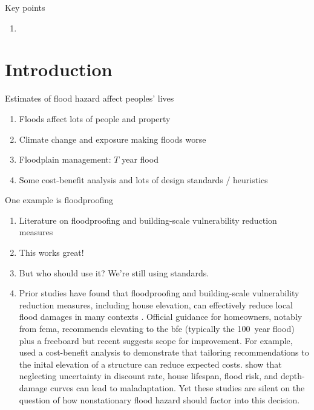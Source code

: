 \documentclass[12pt]{article}
\begin{document}
Key points
\begin{enumerate}
    \item
\end{enumerate}

\clearpage
\section{Introduction}\label{sec:introduction}

Estimates of flood hazard affect peoples' lives
\begin{enumerate}
    \item Floods affect lots of people and property
    \item Climate change and exposure making floods worse
    \item Floodplain management: $T$ year flood
    \item Some cost-benefit analysis and lots of design standards / heuristics
\end{enumerate}
One example is floodproofing
\begin{enumerate}
    \item Literature on floodproofing and building-scale vulnerability reduction measures
    \item This works great!
    \item But who should use it? We're still using standards.
    \item Prior studies have found that floodproofing and building-scale vulnerability reduction measures, including house elevation, can effectively reduce local flood damages in many contexts \citep{demoel_reducing:2014,deruig_building:2020,kreibich_building:2005,slotter_floodproofing:2020,Rozer:2016dn,mobley_mitigation:2020,aerts_cost:2018}.
          Official guidance for homeowners, notably from \gls{fema}, recommends elevating to the \gls{bfe} (typically the \SI{100}{year} flood) plus a freeboard \citep{fema_retrofitting:2014,asce_24-14:2015,fema_retrofitting:2014} but recent suggests scope for improvement.
          For example, \citet{xian_elevation:2017} used a cost-benefit analysis to demonstrate that tailoring recommendations to the inital elevation of a structure can reduce expected costs.
          \citet{zarekarizi_suboptimal:2020} show that neglecting uncertainty in discount rate, house lifespan, flood risk, and depth-damage curves can lead to maladaptation.
          Yet these studies are silent on the question of how nonstationary flood hazard should factor into this decision.
\end{enumerate}
\end{document}
